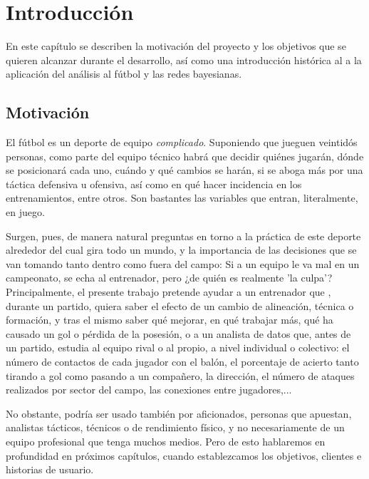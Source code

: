 \chapter{Introducción}

En este capítulo se describen la motivación del proyecto y los objetivos que
se quieren alcanzar durante el desarrollo, así como una introducción histórica al
a la aplicación del análisis al fútbol y las redes bayesianas. 

\section{Motivación}

El fútbol es un deporte de equipo  \textit{complicado}. Suponiendo que 
jueguen veintidós personas, como parte del equipo técnico habrá que 
decidir quiénes jugarán, dónde se posicionará cada uno, cuándo y qué 
cambios se harán, si se aboga más por una táctica defensiva u ofensiva, 
así como en qué hacer incidencia en los entrenamientos, entre otros. 
Son bastantes las variables que entran, literalmente, en juego. 

Surgen, pues, de manera natural preguntas en torno a la práctica de 
este deporte alrededor del cual gira todo un mundo, y la importancia 
de las decisiones que se van tomando tanto dentro como fuera del 
campo: Si a un equipo le va mal en un campeonato, se echa al entrenador, pero ¿de quién 
es realmente 'la culpa'?
Principalmente,  el presente trabajo pretende ayudar a un 
entrenador que , durante un partido, quiera saber el efecto de un 
cambio de alineación, técnica o formación, y tras el mismo saber 
qué mejorar, en qué trabajar más, qué ha causado un gol o pérdida 
de la posesión, o a un analista de datos que, antes de un partido, 
estudia al equipo rival o al propio, a nivel individual o colectivo: 
el número de contactos de cada jugador con el balón, el porcentaje 
de acierto tanto tirando a gol como pasando a un compañero, la 
dirección, el número de ataques realizados por sector del campo, 
las conexiones entre jugadores,...

No obstante, podría ser usado también por aficionados, personas que apuestan, analistas tácticos, técnicos o de rendimiento físico, y no necesariamente de un equipo profesional que tenga muchos medios. Pero de esto hablaremos en profundidad en próximos capítulos, cuando establezcamos los objetivos, clientes e historias de usuario.

